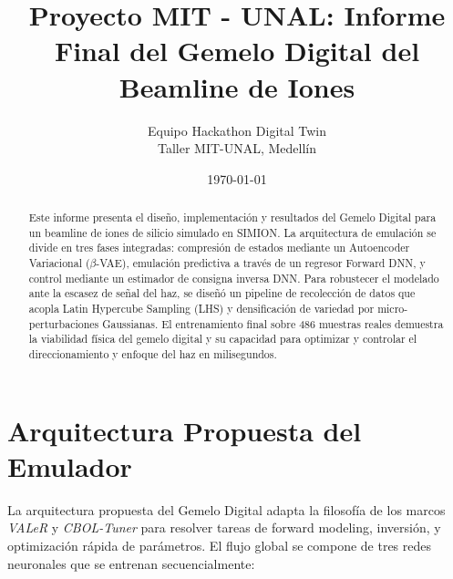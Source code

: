 \documentclass[12pt,letterpaper]{article}
\title{\textbf{Proyecto MIT - UNAL: Informe Final del Gemelo Digital del Beamline de Iones}}
\author{Equipo Hackathon Digital Twin \\ Taller MIT-UNAL, Medellín}
\date{\today}
\begin{document}
\maketitle

\begin{abstract}
Este informe presenta el diseño, implementación y resultados del Gemelo Digital para un beamline de iones de silicio simulado en SIMION. La arquitectura de emulación se divide en tres fases integradas: compresión de estados mediante un Autoencoder Variacional ($\beta$-VAE), emulación predictiva a través de un regresor Forward DNN, y control mediante un estimador de consigna inversa DNN. Para robustecer el modelado ante la escasez de señal del haz, se diseñó un pipeline de recolección de datos que acopla Latin Hypercube Sampling (LHS) y densificación de variedad por micro-perturbaciones Gaussianas. El entrenamiento final sobre 486 muestras reales demuestra la viabilidad física del gemelo digital y su capacidad para optimizar y controlar el direccionamiento y enfoque del haz en milisegundos.
\end{abstract}

\section{Arquitectura Propuesta del Emulador}
La arquitectura propuesta del Gemelo Digital adapta la filosofía de los marcos \textit{VALeR} y \textit{CBOL-Tuner} para resolver tareas de forward modeling, inversión, y optimización rápida de parámetros. El flujo global se compone de tres redes neuronales que se entrenan secuencialmente:
\end{document}
